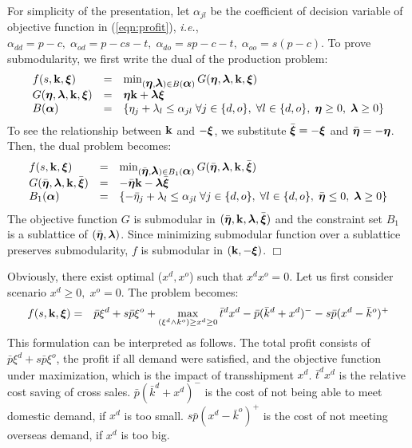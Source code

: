 \documentclass[mnsc,nonblindrev,copyedit]{informs2_wz} %
\newcommand{\qed}{ \hfill $\Box$ }
\newcommand{\xiv}{\mbox{\boldmath$\xi$}}
\newcommand{\etav}{\mbox{\boldmath$\eta$}}
\newcommand{\lambdav}{\mbox{\boldmath$\lambda$}}
\newcommand{\alphav}{\mbox{\boldmath$\alpha$}}
\begin{document}
\medskip

 For simplicity of the presentation, let $\alpha_{jl}$ be the coefficient of decision variable of objective function in (\ref{eqn:profit}), {\it i.e.}, $\alpha_{dd} = p-c, \; \alpha_{od} = p-cs-t,\; \alpha_{do} = sp -c -t, \; \alpha_{oo} = s(p-c)$.  To prove submodularity, we first write the dual of the production problem:
\begin{eqnarray*}
\begin{array}{lll}
    f(s,\bold k, \xiv) &=& \min_{(\etav, \lambdav) \in B (\alphav)} G (\etav, \lambdav, \bold k ,\xiv)  \\
    G(\etav,\lambdav,\bold k, \xiv) &=& \etav \bold k + \lambdav \xiv \\
    B (\alphav) &=& \{\eta_j+\lambda_l  \leq \alpha_{jl} \; \forall j \in \{d,o\}, \; \forall l \in \{d,o\},\;  \etav \geq 0,\; \lambdav \geq 0 \}
\end{array}
\end{eqnarray*}
To see the relationship between $\bold k$ and $-\xiv$, we substitute $\bar{\xiv} = - \xiv$ and $\bar{\etav} = - \etav$.  Then, the dual problem becomes:
\begin{eqnarray*}
\begin{array}{lll}
    f(s,\bold k, \xiv) &=& \min_{(\bar{\etav}, \lambdav) \in B_1 (\alphav)} G (\bar{\etav}, \lambdav, \bold k ,\bar{\xiv})  \\
    G(\bar{\etav},\lambdav,\bold k, \bar{\xiv}) &=& -\bar{\etav} \bold k - \lambdav \bar{\xiv} \\
     B_1(\alphav) &=& \{-\bar{\eta}_j+\lambda_l  \leq \alpha_{jl} \; \forall j \in \{d,o\}, \; \forall l \in \{d,o\},\;  \bar{\etav} \leq 0,\; \lambdav \geq 0 \}
\end{array}
\end{eqnarray*}
The objective function $G$ is submodular in $(\bar{\etav},\bold k,\lambdav, \bar{\xiv})$ and the constraint set $B_1$  is a sublattice of $(\bar{\etav},\lambdav)$.  Since minimizing submodular function over a sublattice preserves submodularity, $f$ is submodular in $(\bold{k}, -\xiv)$.  \qed

\medskip

Obviously, there exist optimal ($x^d,x^o$) such that $x^dx^o =0$.  Let us first consider scenario $x^d \geq 0, \;x^o =0$.  The problem becomes:
\begin{eqnarray*}
    f(s,\bold {k},\xiv) &=& \bar{p}\xi^d + s\bar{p}\xi^o +\max_{(\xi^d \wedge k^o) \geq x^d \geq 0} \bar{t}^d x^d - \bar{p}(\bar{k}^d + x^d)^- - s\bar{p}(x^d-\bar{k}^o)^+
\end{eqnarray*}
This formulation can be interpreted as follows.  The total profit consists of $\bar{p}\xi^d + s\bar{p}\xi^o$, the profit if all demand were satisfied, and the objective function under maximization, which is the impact of transshipment $x^d$.  $\bar{t}^d x^d$ is the relative cost saving of cross sales.  $\bar{p}(\bar{k}^d + x^d)^-$ is the cost of not being able to meet domestic demand, if $x^d$ is too small.  $s\bar{p}(x^d-\bar{k}^o)^+$ is the cost of not meeting overseas demand, if $x^d$ is too big.
\end{document}
